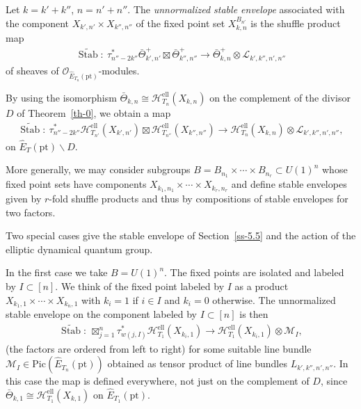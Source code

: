 \documentclass[pdftex]{sigma}
\numberwithin{equation}{section}
\begin{document}
\begin{Definition} Let $k=k'+k''$, $n=n'+n''$. The {\em unnormalized stable envelope} associated with the component $X_{k',n'}\times X_{k'',n''}$ of the fixed point set $X_{k,n}^{B_{n'}}$ is the shuffle product map
 \begin{gather*}
 \widetilde{\operatorname{Stab}}\colon \ \tau_{n''-2k''}^*\bar\Theta^+_{k',n'} \boxtimes\bar\Theta^+_{k'',n''} \to \bar\Theta^+_{k,n}\otimes\mathcal L_{k',k'',n',n''}
 \end{gather*}
 of sheaves of $\mathcal O_{\hat E_{T_n}(\mathrm{pt})}$-modules.
\end{Definition}
By using the isomorphism $\bar\Theta_{k,n}\cong\mathcal H_{T_n}^{\mathrm{ell}}(X_{k,n})$ on the complement of the divisor $D$ of Theorem~\ref{th-0}, we obtain a map
\begin{gather*}
 \widetilde{\operatorname{Stab}}\colon \ \tau_{n''-2k''}^*\mathcal H^{\mathrm{ell}}_{T_{n'}}(X_{k',n'}) \boxtimes\mathcal H^{\mathrm{ell}}_{T_{n''}}(X_{k'',n''}) \to\mathcal H^{\mathrm{ell}}_{T_n}(X_{k,n})\otimes \mathcal L_{k',k'',n',n''},
\end{gather*}
on $\hat E_T(\mathrm{pt})\smallsetminus D$.

More generally, we may consider subgroups $B=B_{n_1}\times\cdots \times B_{n_r}\subset U(1)^n$ whose fixed point sets have components $X_{k_1,n_1}\times\cdots \times X_{k_r,n_r}$ and define stable envelopes given by $r$-fold shuffle products and thus by compositions of stable envelopes for two factors.

Two special cases give the stable envelope of Section~\ref{ss-5.5} and the action of the elliptic dynamical quantum group.

In the first case we take $B=U(1)^n$. The fixed points are isolated and labeled by $I\subset[n]$. We think of the fixed point labeled by $I$ as a product $X_{k_1,1}\times\cdots\times X_{k_n,1}$ with $k_i=1$ if $i\in I$ and $k_i=0$ otherwise. The unnormalized stable envelope on the component labeled by $I\subset [n]$ is then
\begin{gather*}
 \widetilde {\operatorname{Stab}}\colon \ \boxtimes_{j=1}^n \tau^*_{w(j,I)}\mathcal H^{\mathrm{ell}}_{T_1}(X_{k_i,1}) \to\mathcal H^{\mathrm{ell}}_{T_1}(X_{k_i,1})\otimes \mathcal M_I,
\end{gather*}
(the factors are ordered from left to right) for some suitable line bundle $\mathcal M_I\in\mathrm{Pic}(\hat E_{T_n}(\mathrm{pt}))$ obtained as tensor product of line bundles $L_{k',k'',n',n''}$. In this case the map is defined everywhere, not just on the complement of $D$, since $\bar\Theta_{k,1}\cong \mathcal H^\mathrm{ell}_{T_1}(X_{k,1})$ on $\hat E_{T_1}(\mathrm{pt})$.
\end{document}
